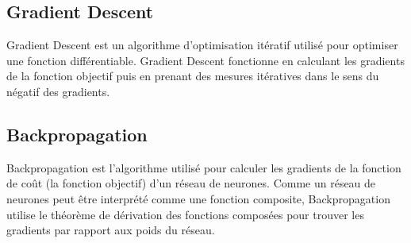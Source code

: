\subsection{Gradient Descent}
Gradient Descent est un algorithme d'optimisation itératif utilisé pour optimiser une fonction différentiable. Gradient Descent fonctionne en calculant les gradients de la fonction objectif puis en prenant des mesures itératives dans le sens du négatif des gradients.

\subsection{Backpropagation}
Backpropagation est l'algorithme utilisé pour calculer les gradients de la fonction de coût (la fonction objectif) d'un réseau de neurones. Comme un réseau de neurones peut être interprété comme une fonction composite, Backpropagation utilise le théorème de dérivation des fonctions composées
pour trouver les gradients par rapport aux poids du réseau.


